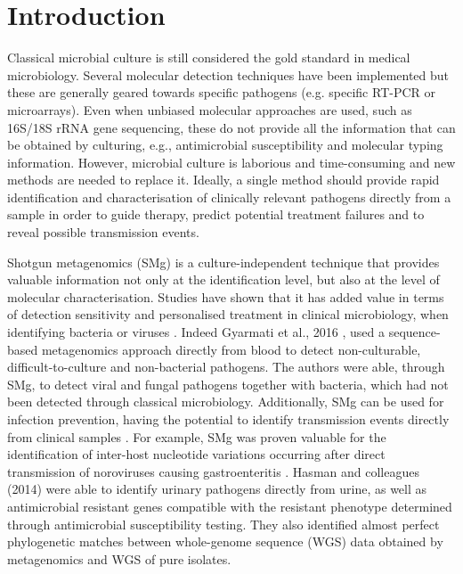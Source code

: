 \section{Introduction} \label{sec:ch2_introduction}

Classical microbial culture is still considered the gold standard in medical microbiology. 
Several molecular detection techniques have been implemented but these are generally geared towards specific pathogens (e.g. specific RT-PCR or microarrays). 
Even when unbiased molecular approaches are used, such as 16S/18S rRNA gene sequencing, these do not provide all the information that can be obtained by culturing, e.g., antimicrobial susceptibility and molecular typing information. 
However, microbial culture is laborious and time-consuming and new methods are needed to replace it. 
Ideally, a single method should provide rapid identification and characterisation of clinically relevant pathogens directly from a sample in order to guide therapy, predict potential treatment failures and to reveal possible transmission events.

Shotgun metagenomics (SMg) is a culture-independent technique that provides valuable information not only at the identification level, but also at the level of molecular characterisation. 
Studies have shown that it has added value in terms of detection sensitivity and personalised treatment in clinical microbiology, when identifying bacteria \citep{hasman_rapid_2014, willmann_antibiotic_2015} or viruses \citep{graf_unbiased_2016}. 
Indeed Gyarmati et al., 2016 \citep{gyarmati_metagenomic_2016}, used a sequence-based metagenomics approach directly from blood to detect non-culturable, difficult-to-culture and non-bacterial pathogens. 
The authors were able, through SMg, to detect viral and fungal pathogens together with bacteria, which had not been detected through classical microbiology. 
Additionally, SMg can be used for infection prevention, having the potential to identify transmission events directly from clinical samples \citep{olson_metagenomic_2017}. 
For example, SMg was proven valuable for the identification of inter-host nucleotide variations occurring after direct transmission of noroviruses causing gastroenteritis \citep{olson_metagenomic_2017}. 
Hasman and colleagues (2014) \citep{hasman_rapid_2014} were able to identify urinary pathogens directly from urine, as well as antimicrobial resistant genes compatible with the resistant phenotype determined through antimicrobial susceptibility testing. They also identified almost perfect phylogenetic matches between whole-genome sequence (WGS) data obtained by metagenomics and WGS of pure isolates. 


